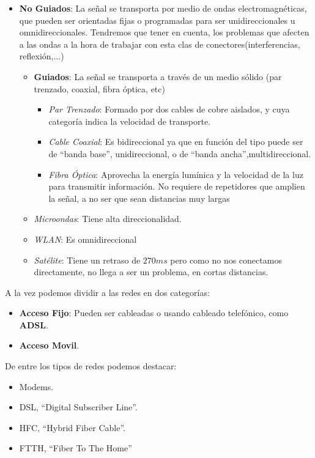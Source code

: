 \begin{itemize}
        \item \textbf{No Guiados}: La señal se transporta por medio de ondas electromagnéticas, que pueden ser orientadas fijas o programadas para ser unidireccionales u omnidireccionales. Tendremos que tener en cuenta, los problemas que afecten a las ondas a la hora de trabajar con esta clas de conectores(interferencias, reflexión,...)
              \begin{itemize}
                      \item \textbf{Guiados}: La señal se transporta a través de un medio sólido (par trenzado, coaxial, fibra óptica, etc)
                            \begin{itemize}
                                    \item \textit{Par Trenzado}: Formado por dos cables de cobre aislados, y cuya categoría indica la velocidad de transporte.
                                    \item \textit{Cable Coaxial}: Es bidireccional ya que en función del tipo puede ser de ``banda base'', unidireccional, o de ``banda ancha'',multidireccional.
                                    \item \textit{Fibra Óptica}: Aprovecha la energía lumínica y la velocidad de la luz para transmitir información. No requiere de repetidores que amplien la señal, a no ser que sean distancias muy largas
                            \end{itemize}
                      \item \textit{Microondas}: Tiene alta direccionalidad.
                      \item \textit{WLAN}: Es omnidireccional
                      \item \textit{Satélite}: Tiene un retraso de \(270 ms\) pero como no nos conectamos directamente, no llega a ser un problema, en cortas distancias.
              \end{itemize}
\end{itemize}
\noindent A la vez podemos dividir a las  redes en dos categorías:
\begin{itemize}
        \item \textbf{Acceso Fijo}: Pueden ser cableadas o usando cableado telefónico, como \textbf{ADSL}.
        \item \textbf{Acceso Movil}.
\end{itemize}
\noindent De entre los tipos de redes podemos destacar:
\begin{itemize}
        \item Modems.
        \item DSL, ``Digital Subscriber Line''.
        \item HFC, ``Hybrid Fiber Cable''.
        \item FTTH, ``Fiber To The Home''
\end{itemize}
